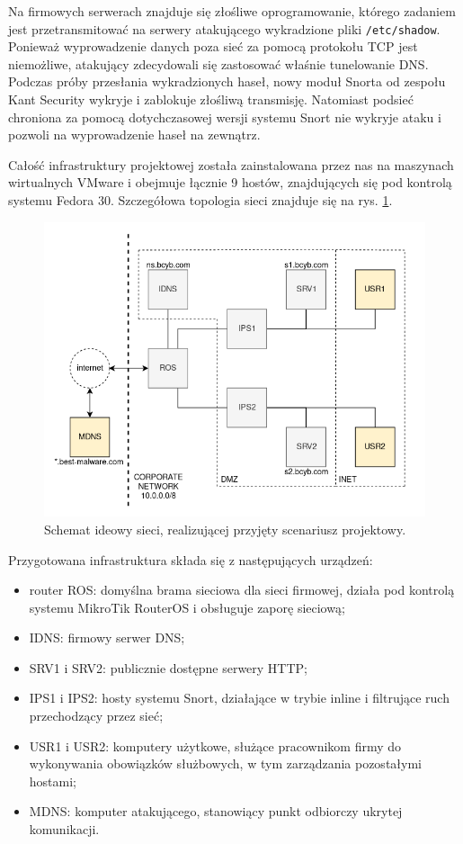 \documentclass{eiti-raport}
\begin{document}
Na firmowych serwerach znajduje się złośliwe oprogramowanie, którego zadaniem jest przetransmitować na serwery atakującego wykradzione pliki \texttt{/etc/shadow}. Ponieważ wyprowadzenie danych poza sieć za pomocą protokołu TCP jest niemożliwe, atakujący zdecydowali się zastosować właśnie tunelowanie DNS. Podczas próby przesłania wykradzionych haseł, nowy moduł Snorta od zespołu Kant Security wykryje i zablokuje złośliwą transmisję. Natomiast podsieć chroniona za pomocą dotychczasowej wersji systemu Snort nie wykryje ataku i pozwoli na wyprowadzenie haseł na zewnątrz. 

Całość infrastruktury projektowej została zainstalowana przez nas na maszynach wirtualnych VMware i obejmuje łącznie 9 hostów, znajdujących się pod kontrolą systemu Fedora 30. Szczegółowa topologia sieci znajduje się na rys. \ref{fig:topologia}. 
\begin{figure}[!h] \centering
	\includegraphics[width=0.9\linewidth]{img/BCYB_topologia.png}
	\caption{Schemat ideowy sieci, realizującej przyjęty scenariusz projektowy.} \label{fig:topologia}
\end{figure}
Przygotowana infrastruktura składa się z następujących urządzeń: 
\begin{itemize}
	\item router ROS: domyślna brama sieciowa dla sieci firmowej, działa pod kontrolą systemu MikroTik RouterOS i obsługuje zaporę sieciową;
	\item IDNS: firmowy serwer DNS;
	\item SRV1 i SRV2: publicznie dostępne serwery HTTP;
	\item IPS1 i IPS2: hosty systemu Snort, działające w trybie inline i filtrujące ruch przechodzący przez sieć;
	\item USR1 i USR2: komputery użytkowe, służące pracownikom firmy do wykonywania obowiązków służbowych, w tym zarządzania pozostałymi hostami;
	\item MDNS: komputer atakującego, stanowiący punkt odbiorczy ukrytej komunikacji. 
\end{itemize}
\end{document}
